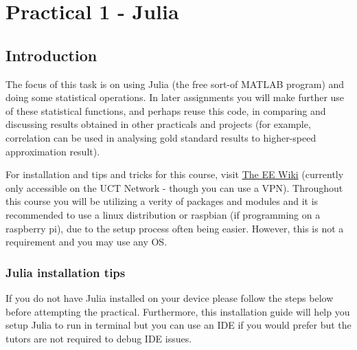 \section{Practical 1 - Julia}

\label{sec:Prac1}
\subsection{Introduction}
The focus of this task is on using Julia (the free sort-of MATLAB program) and doing some statistical operations. In later assignments you will make further use of these statistical functions, and perhaps reuse this code, in comparing and discussing results obtained in other practicals and projects (for example, correlation can be used in analysing gold standard results to higher-speed approximation result).

For installation and tips and tricks for this course, visit \href{http://wiki.ee.uct.ac.za/Octave}{The EE Wiki} (currently only accessible on the UCT Network - though you can use a VPN). Throughout this course you will be utilizing a verity of packages and modules and it is recommended to use a linux distribution or raspbian (if programming on a raspberry pi), due to the setup process often being easier. However, this is not a requirement and you may use any OS.

\subsubsection{Julia installation tips}
If you do not have Julia installed on your device please follow the steps below before attempting the practical. Furthermore, this installation guide will help you setup Julia to run in terminal but you can use an IDE if you would prefer but the tutors are not required to debug IDE issues. 

